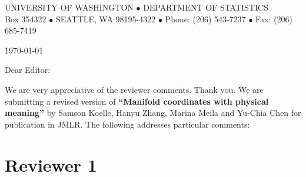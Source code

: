 \documentclass[draft]{article}
\begin{document}
\pagestyle{empty}

\begin{center}
{\large UNIVERSITY OF WASHINGTON $\bullet$ DEPARTMENT OF STATISTICS}\\
{\small Box 354322 $\bullet$ SEATTLE, WA 98195-4322 $\bullet$ Phone:
(206) 543-7237 $\bullet$ Fax: (206) 685-7419} \\
\end{center}

\vspace{-0.5cm}
\begin{tabbing}
{}\` \today  \\
\end{tabbing}

\vspace{-0.5cm}
Dear Editor:\\

\vspace{0.5in}


We are very appreciative of the reviewer comments.  Thank you.  We are submitting a revised version of {\bf ``Manifold coordinates with physical meaning''} by Samson Koelle, Hanyu Zhang, Marina Meila and Yu-Chia Chen for publication in JMLR.  The following addresses particular comments:

\section{Reviewer 1}
\end{document}
